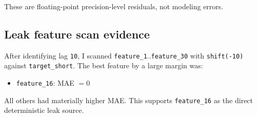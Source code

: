 These are floating-point precision-level residuals, not modeling errors.

\subsection{Leak feature scan evidence}
After identifying lag \texttt{10}, I scanned \texttt{feature\_1}..\texttt{feature\_30} with \texttt{shift(-10)} against \texttt{target\_short}. The best feature by a large margin was:
\begin{itemize}[leftmargin=1.5em]
  \item \texttt{feature\_16}: MAE $=0$
\end{itemize}
All others had materially higher MAE. This supports \texttt{feature\_16} as the direct deterministic leak source.
